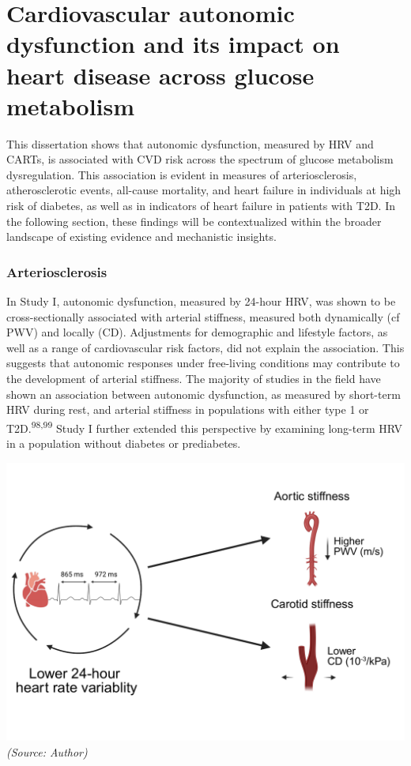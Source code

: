 \documentclass[
  a4paper,
  headsepline=true,
  open=left]{scrbook}
\begin{document}
\hypertarget{cardiovascular-autonomic-dysfunction-and-its-impact-on-heart-disease-across-glucose-metabolism}{%
\section{Cardiovascular autonomic dysfunction and its impact on heart
disease across glucose
metabolism}\label{cardiovascular-autonomic-dysfunction-and-its-impact-on-heart-disease-across-glucose-metabolism}}

This dissertation shows that autonomic dysfunction, measured by HRV and
CARTs, is associated with CVD risk across the spectrum of glucose
metabolism dysregulation. This association is evident in measures of
arteriosclerosis, atherosclerotic events, all-cause mortality, and heart
failure in individuals at high risk of diabetes, as well as in
indicators of heart failure in patients with T2D. In the following
section, these findings will be contextualized within the broader
landscape of existing evidence and mechanistic insights.

\hypertarget{arteriosclerosis-1}{%
\subsubsection{Arteriosclerosis}\label{arteriosclerosis-1}}

In Study I, autonomic dysfunction, measured by 24-hour HRV, was shown to
be cross-sectionally associated with arterial stiffness, measured both
dynamically (cf PWV) and locally (CD). Adjustments for demographic and
lifestyle factors, as well as a range of cardiovascular risk factors,
did not explain the association. This suggests that autonomic responses
under free-living conditions may contribute to the development of
arterial stiffness. The majority of studies in the field have shown an
association between autonomic dysfunction, as measured by short-term HRV
during rest, and arterial stiffness in populations with either type 1 or
T2D.\textsuperscript{98,99} Study I further extended this perspective by
examining long-term HRV in a population without diabetes or prediabetes.

\includegraphics{images/hrv_arterial_stiffness.pdf} \emph{(Source:
Author)}
\end{document}
